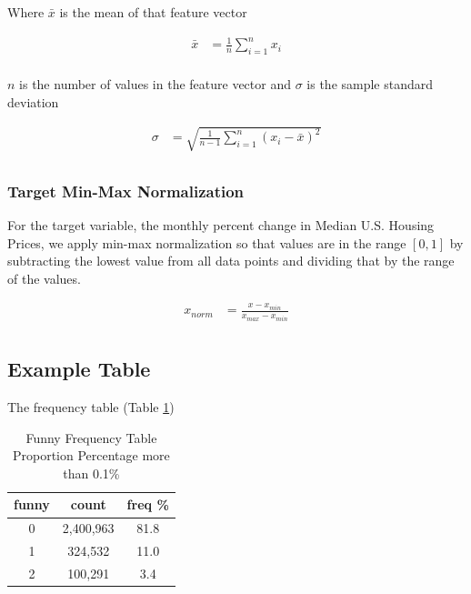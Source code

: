 \documentclass [MS] {uclathes}
\begin{document}
Where $\bar{x}$ is the mean of that feature vector 

$$
\begin{aligned}
\bar{x} &= \frac{1}{n}\sum_{i=1}^{n}{x_i} \\
\end{aligned}
$$

$n$ is the number of values in the feature vector and $\sigma$ is the sample standard deviation

$$
\begin{aligned}
\sigma &= \sqrt{ \frac{1}{n-1}\sum_{i=1}^{n}\left({x_i - \bar{x}}\right)^2}\\
\end{aligned}
$$


\subsubsection{Target Min-Max Normalization}

For the target variable, the monthly percent change in Median U.S. Housing Prices, we apply min-max normalization so that values are in the range $\left[0, 1\right]$ by subtracting the lowest value from all data points and dividing that by the range of the values.

$$
\begin{aligned}
x_{norm} &= \frac{x - x_{min}}{x_{max} - x_{min}}\\
\end{aligned}
$$


\subsection{Example Table}
The frequency table (Table \ref{tab:Funny_Frequency}) 


\begin{table}[H]
\centering
\renewcommand{\arraystretch}{0.75}
\caption{Funny Frequency Table Proportion Percentage more than 0.1\%}
\label{tab:Funny_Frequency}
\begin{tabular}{c|c|c} \hline
\textbf{funny} & \textbf{count} & \textbf{freq \%} \\ \hline \hline
0              & 2,400,963       & 81.8              \\
1              & 324,532         & 11.0              \\
2              & 100,291         & 3.4               \\
 \hline
\end{tabular}
\end{table}
\end{document}
